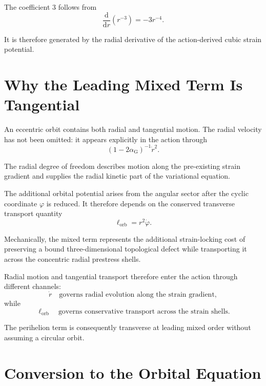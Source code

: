 The coefficient $3$ follows from
\begin{equation}
    \frac{\mathrm{d}}{\mathrm{d}r} \left( r^{-3} \right) = -3r^{-4}.
\end{equation}

It is therefore generated by the radial derivative of the action-derived cubic strain potential.

\section{Why the Leading Mixed Term Is Tangential}

An eccentric orbit contains both radial and tangential motion. The radial velocity has not been omitted: it appears explicitly in the action through
\begin{equation}
    \left( 1-2\alpha_{\mathrm{G}} \right)^{-1} \dot{r}^2.
\end{equation}

The radial degree of freedom describes motion along the pre-existing strain gradient and supplies the radial kinetic part of the variational equation.

The additional orbital potential arises from the angular sector after the cyclic coordinate $\varphi$ is reduced. It therefore depends on the conserved transverse transport quantity
\begin{equation}
    \ell_{\mathrm{orb}} = r^2\dot{\varphi}.
\end{equation}

Mechanically, the mixed term represents the additional strain-locking cost of preserving a bound three-dimensional topological defect while transporting it across the concentric radial prestress shells.

Radial motion and tangential transport therefore enter the action through different channels:
\begin{equation}
    \dot{r} \quad \text{governs radial evolution along the strain gradient},
\end{equation}
while
\begin{equation}
    \ell_{\mathrm{orb}} \quad \text{governs conservative transport across the strain shells}.
\end{equation}

The perihelion term is consequently transverse at leading mixed order without assuming a circular orbit.

\section{Conversion to the Orbital Equation}

